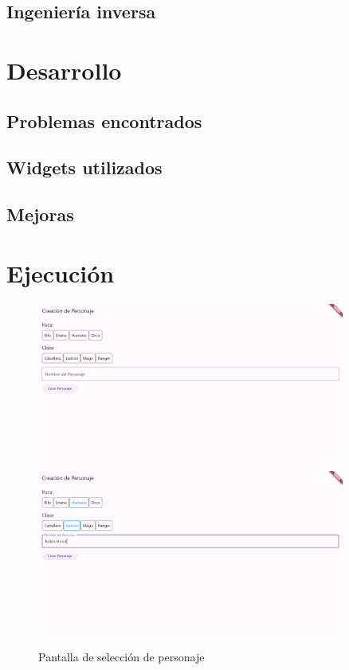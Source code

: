\documentclass{article}
\begin{document}
\subsection{Ingeniería inversa}


\newpage
\section{Desarrollo}
\subsection{Problemas encontrados}

\subsection{Widgets utilizados}

\subsection{Mejoras}



\newpage
\section{Ejecución}

\begin{figure}[h]
    \centering
    \vspace{5pt}
    \includegraphics[width=0.9\textwidth]{Ejecucion_1.png}
    \includegraphics[width=0.9\textwidth]{Ejecucion_2.png}
    \caption{Pantalla de selección de personaje}
    \label{fig:ejecucion_1}
\end{figure}
\end{document}
